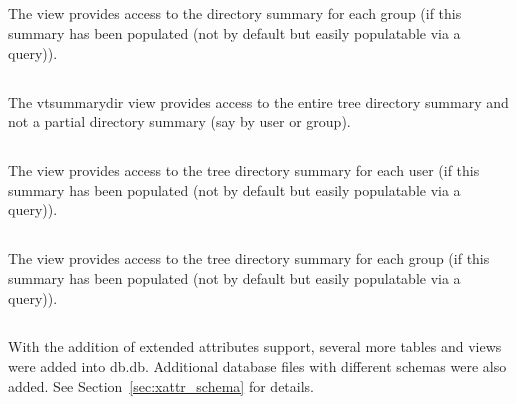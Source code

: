 \subsection{\vsummarygroup}
The \vsummarygroup view provides access to the directory summary for
each group (if this summary has been populated (not by default but
easily populatable via a query)).

\subsection{\vtsummarydir}
The vtsummarydir view provides access to the entire tree directory
summary and not a partial directory summary (say by user or group).

\subsection{\vtsummaryuser}
The \vtsummaryuser view provides access to the tree directory summary
for each user (if this summary has been populated (not by default but
easily populatable via a query)).

\subsection{\vtsummarygroup}
The \vtsummarygroup view provides access to the tree directory summary
for each group (if this summary has been populated (not by default but
easily populatable via a query)).

\subsection{\xattrs}
With the addition of extended attributes support, several more tables
and views were added into db.db. Additional database files with
different schemas were also added. See Section~\ref{sec:xattr_schema}
for details.
